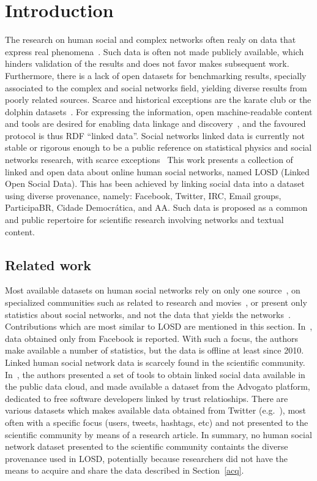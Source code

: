 \documentclass[review]{elsarticle}
\begin{document}
\section{Introduction}
The research on human social and complex networks often realy on data that express
real phenomena~\cite{c1,c2,c3}.
Such data is often not made publicly available, which hinders validation of the results and does not favor makes subsequent work.
Furthermore, there is a lack of open datasets for benchmarking results,
specially associated to the complex and social networks field,
yielding diverse results from poorly related sources.
Scarce and historical exceptions are the karate club or the dolphin datasets~\cite{newmanBook,dolphin}.
For expressing the information,
open machine-readable content and tools are desired for enabling
data linkage and discovery~\cite{o1,o2},
and the favoured protocol is thus RDF ``linked data''.
Social networks linked data is currently not stable or rigorous enough to be
a public reference on statistical physics and social networks research,
with scarce exceptions~\cite{l1,l2}
This work presents a collection of linked and open data
about online human social networks,
named LOSD (Linked Open Social Data).
This has been achieved by linking social data into a dataset using diverse
provenance, namely: Facebook, Twitter, IRC, Email groups, ParticipaBR, Cidade Democrática, and AA.
Such data is proposed as a common and public repertoire for scientific
research involving networks and textual content.

\subsection{Related work}
Most available datasets on human social networks rely on only one source~\cite{o1,o2,o3,o4},
on specialized communities such as related to research and movies~\cite{s1,s2,s3,s4,s5},
or present only statistics about social networks, and not the data that yields the networks~\cite{st1,st2,st3,st4}.
Contributions which are most similar to LOSD are mentioned in this section.
In~\cite{fb1}, data obtained only from Facebook is reported.
With such a focus, the authors make available a number of statistics,
but the data is offline at least since 2010.
Linked human social network data is scarcely found in the scientific community.
In~\cite{foaf1}, the authors presented a set of tools to obtain linked social data available in the public data cloud, and made available a dataset from the Advogato platform,
dedicated to free software developers linked by trust relatioships.
There are various datasets which makes available data obtained from Twitter (e.g.~\cite{tw1,tw2,t3,t4}),
most often with a specific focus (users, tweets, hashtags, etc)
and not presented to the scientific community by means of a research article.
In summary, no human social network dataset presented to the
scientific community containts the diverse provenance used in LOSD,
potentially because researchers did not have the means to acquire and
share the data described in Section~\ref{acq}.
\end{document}
